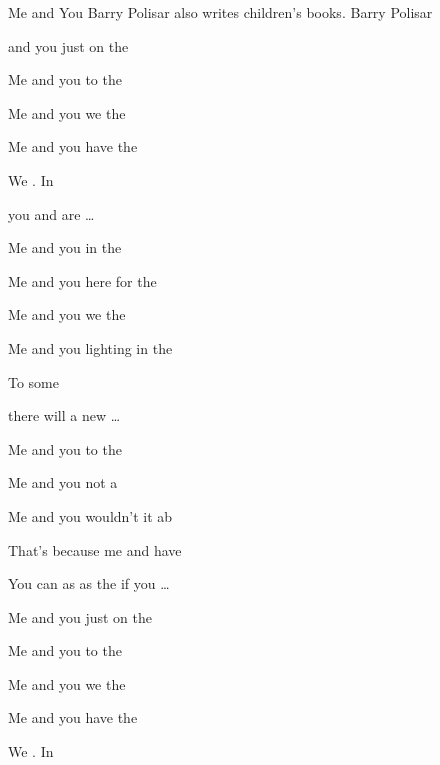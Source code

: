 \begin{SBSong}{Me and You}
  {Barry Polisar also writes children's books.}
  {Barry Polisar}
  \begin{SBVerse}
     and you just  on the 

    Me and you  to the 
    
    Me and you we  the 
    
    Me and you have  the 
    
    We . In
    
    you and  are  \ldots
  \end{SBVerse} 
  \begin{SBVerse}   
    Me and you  in the 
    
    Me and you here  for the 
    
    Me and you we  the  
    
    Me and you lighting  in the 
    
    To  some
    
    there will  a new \ldots
  \end{SBVerse}  
  \begin{SBVerse}  
    Me and you  to the 
    
    Me and you not  a 
    
    Me and you wouldn't  it ab
    
    That's because me and  have 
    
    You can  as  as the  if you \ldots
  \end{SBVerse}  
  \begin{SBVerse}  
    Me and you just  on the 
    
    Me and you  to the 
    
    Me and you we  the  
    
    Me and you have  the 
    
    We . In
    

\end{SBVerse}
\end{SBSong}
